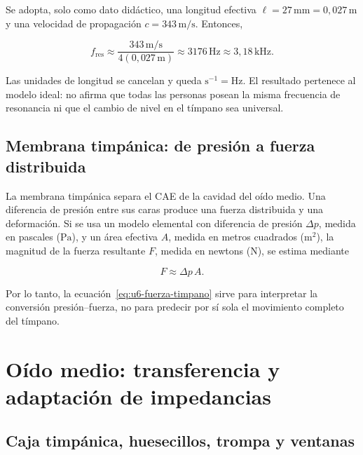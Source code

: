 Se adopta, solo como dato didáctico, una longitud efectiva
\(\ell=27\,\text{mm}=0{,}027\,\text{m}\) y una velocidad de propagación
\(c=343\,\text{m}/\text{s}\). Entonces,

\[
    f_\mathrm{res}
      \approx\frac{343\,\text{m}/\text{s}}
                    {4(0{,}027\,\text{m})}
      \approx3176\,\text{Hz}
      \approx3{,}18\,\text{kHz}.
\]

Las unidades de longitud se cancelan y queda \(\text{s}^{-1}=\text{Hz}\).
El resultado pertenece al modelo ideal: no afirma que todas las personas
posean la misma frecuencia de resonancia ni que el cambio de nivel en el
tímpano sea universal.

\subsection{Membrana timpánica: de presión a fuerza distribuida}
\label{sec:u6-timpano}

La membrana timpánica separa el CAE de la cavidad del oído medio. Una
diferencia de presión entre sus caras produce una fuerza distribuida y una
deformación. Si se usa un modelo elemental con diferencia de presión
\(\Delta p\), medida en pascales (\(\text{Pa}\)), y un área efectiva \(A\),
medida en metros cuadrados (\(\text{m}^2\)), la magnitud de la fuerza
resultante \(F\), medida en newtons (\(\text{N}\)), se estima mediante

\begin{equation}
    F\approx\Delta p\,A.
    \label{eq:u6-fuerza-timpano}
\end{equation}

 Por lo tanto, la ecuación~\eqref{eq:u6-fuerza-timpano}
sirve para interpretar la conversión presión--fuerza, no para predecir por sí
sola el movimiento completo del tímpano.

\section{Oído medio: transferencia y adaptación de impedancias}
\label{sec:u6-oido-medio}

\subsection{Caja timpánica, huesecillos, trompa y ventanas}
\label{sec:u6-anatomia-oido-medio}

